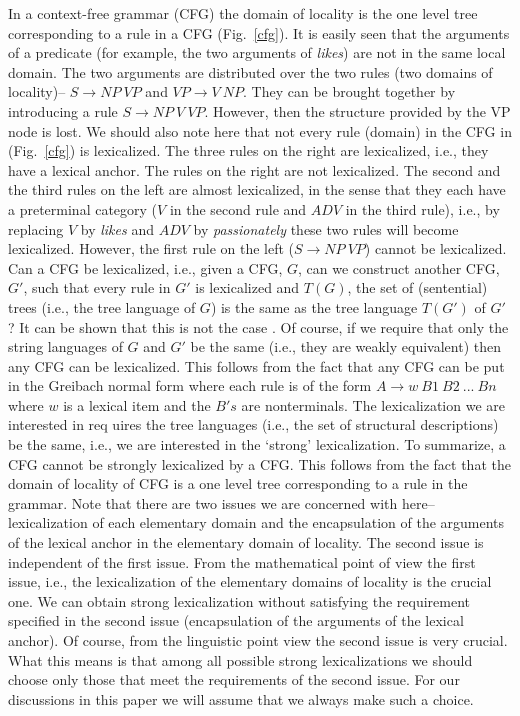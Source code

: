 In a context-free grammar (CFG) the domain of locality is the one
level tree corresponding to a rule in a CFG (Fig.~\ref{cfg}). It is
easily seen that the arguments of a predicate (for example, the two
arguments of {\it likes}) are not in the same local domain. The two
arguments are distributed over the two rules (two domains of
locality)-- $S \rightarrow NP \ VP$ and $VP \rightarrow V \ NP$. They
can be brought together by introducing a rule $S \rightarrow NP \ V \
VP $. However, then the structure provided by the VP node is lost. We
should also note here that not every rule (domain) in the CFG in
(Fig.~\ref{cfg}) is lexicalized. The three rules on the right are
lexicalized, i.e., they have a lexical anchor. The rules on the right
are not lexicalized. The second and the third rules on the left are
almost lexicalized, in the sense that they each have a preterminal
category ($V$ in the second rule and $ADV$ in the third rule), i.e.,
by replacing $V$ by {\it likes} and $ADV$ by {\it passionately} these
two rules will become lexicalized. However, the first rule on the left
($S \rightarrow NP \ VP$) cannot be lexicalized. Can a CFG be
lexicalized, i.e., given a CFG, $G$, can we construct another CFG,
$G'$, such that every rule in $G'$ is lexicalized and $T(G)$, the set
of (sentential) trees (i.e., the tree language of $G$) is the same as
the tree language $T(G')$ of $G'$? It can be shown that this is not
the case \cite{joshischabes96}.  Of course, if we require that only
the string languages of $G$ and $G'$ be the same (i.e., they are
weakly equivalent) then any CFG can be lexicalized. This follows from
the fact that any CFG can be put in the Greibach normal form where
each rule is of the form $ A \rightarrow w \ B1 \ B2 \ ... \ Bn$ where
$w$ is a lexical item and the $B's$ are nonterminals. The
lexicalization we are interested in req uires the tree languages
(i.e., the set of structural descriptions) be the same, i.e., we are
interested in the `strong' lexicalization. To summarize, a CFG cannot
be strongly lexicalized by a CFG. This follows from the fact that the
domain of locality of CFG is a one level tree corresponding to a rule
in the grammar. Note that there are two issues we are concerned with
here-- lexicalization of each elementary domain and the encapsulation
of the arguments of the lexical anchor in the elementary domain of
locality. The second issue is independent of the first issue. From the
mathematical point of view the first issue, i.e., the lexicalization
of the elementary domains of locality is the crucial one. We can
obtain strong lexicalization without satisfying the requirement
specified in the second issue (encapsulation of the arguments of the
lexical anchor). Of course, from the linguistic point view the second
issue is very crucial. What this means is that among all possible
strong lexicalizations we should choose only those that meet the
requirements of the second issue. For our discussions in this paper we
will assume that we always make such a choice.


